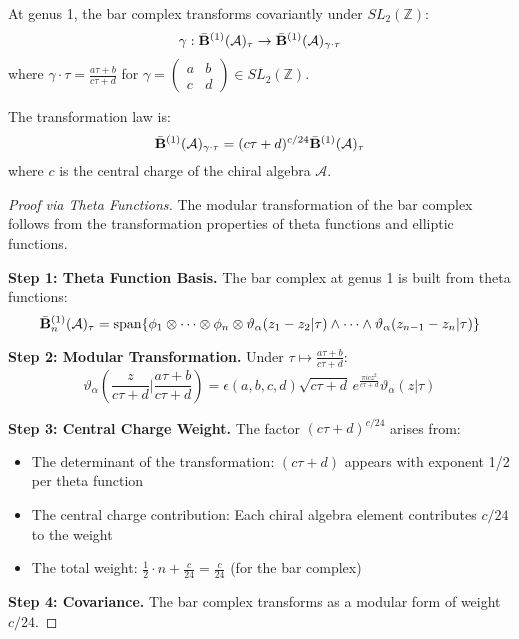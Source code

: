 \begin{theorem}\label{thm:modular-invariance}
At genus 1, the bar complex transforms covariantly under $SL_2(\mathbb{Z})$:
$$\gamma: \bar{\mathbf{B}}^{(1)}(\mathcal{A})_\tau \to \bar{\mathbf{B}}^{(1)}(\mathcal{A})_{\gamma \cdot \tau}$$
where $\gamma \cdot \tau = \frac{a\tau + b}{c\tau + d}$ for $\gamma = \begin{pmatrix} a & b \\ c & d \end{pmatrix} \in SL_2(\mathbb{Z})$.

The transformation law is:
$$\bar{\mathbf{B}}^{(1)}(\mathcal{A})_{\gamma \cdot \tau} = (c\tau + d)^{c/24} \bar{\mathbf{B}}^{(1)}(\mathcal{A})_\tau$$
where $c$ is the central charge of the chiral algebra $\mathcal{A}$.
\end{theorem}

\begin{proof}[Proof via Theta Functions]
The modular transformation of the bar complex follows from the transformation properties of theta functions and elliptic functions.

\textbf{Step 1: Theta Function Basis.} The bar complex at genus 1 is built from theta functions:
$$\bar{\mathbf{B}}^{(1)}_n(\mathcal{A})_\tau = \text{span}\{\phi_1 \otimes \cdots \otimes \phi_n \otimes \vartheta_{\alpha}(z_1-z_2|\tau) \wedge \cdots \wedge \vartheta_{\alpha}(z_{n-1}-z_n|\tau)\}$$

\textbf{Step 2: Modular Transformation.} Under $\tau \mapsto \frac{a\tau + b}{c\tau + d}$:
$$\vartheta_{\alpha}\left(\frac{z}{c\tau+d}\bigg|\frac{a\tau+b}{c\tau+d}\right) = \epsilon(a,b,c,d)\sqrt{c\tau+d}\,e^{\frac{\pi i cz^2}{c\tau+d}}\vartheta_{\alpha}(z|\tau)$$

\textbf{Step 3: Central Charge Weight.} The factor $(c\tau + d)^{c/24}$ arises from:
\begin{itemize}
\item The determinant of the transformation: $(c\tau + d)$ appears with exponent 1/2 per theta function
\item The central charge contribution: Each chiral algebra element contributes $c/24$ to the weight
\item The total weight: $\frac{1}{2} \cdot n + \frac{c}{24} = \frac{c}{24}$ (for the bar complex)
\end{itemize}

\textbf{Step 4: Covariance.} The bar complex transforms as a modular form of weight $c/24$.
\end{proof}

